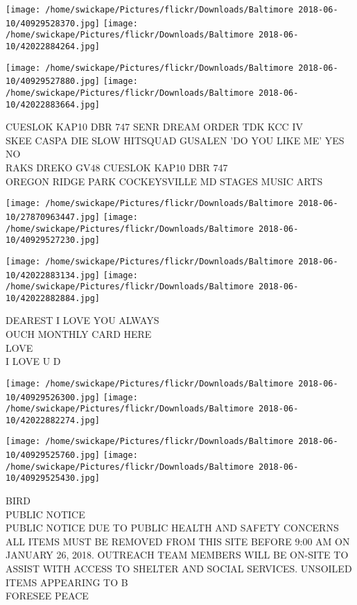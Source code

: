 \documentclass[10pt,letterpaper]{article}
\begin{document}
\texttt{[image: /home/swickape/Pictures/flickr/Downloads/Baltimore 2018-06-10/40929528370.jpg]}
\texttt{[image: /home/swickape/Pictures/flickr/Downloads/Baltimore 2018-06-10/42022884264.jpg]}

\texttt{[image: /home/swickape/Pictures/flickr/Downloads/Baltimore 2018-06-10/40929527880.jpg]}
\texttt{[image: /home/swickape/Pictures/flickr/Downloads/Baltimore 2018-06-10/42022883664.jpg]}

CUESLOK KAP10 DBR 747 SENR DREAM ORDER TDK KCC IV\\
SKEE CASPA DIE SLOW HITSQUAD GUSALEN 'DO YOU LIKE ME' YES NO\\
RAKS DREKO GV48 CUESLOK KAP10 DBR 747\\
OREGON RIDGE PARK COCKEYSVILLE MD STAGES MUSIC ARTS
\pagebreak

\texttt{[image: /home/swickape/Pictures/flickr/Downloads/Baltimore 2018-06-10/27870963447.jpg]}
\texttt{[image: /home/swickape/Pictures/flickr/Downloads/Baltimore 2018-06-10/40929527230.jpg]}

\texttt{[image: /home/swickape/Pictures/flickr/Downloads/Baltimore 2018-06-10/42022883134.jpg]}
\texttt{[image: /home/swickape/Pictures/flickr/Downloads/Baltimore 2018-06-10/42022882884.jpg]}

DEAREST I LOVE YOU ALWAYS\\
OUCH MONTHLY CARD HERE\\
LOVE\\
I LOVE U D
\pagebreak

\texttt{[image: /home/swickape/Pictures/flickr/Downloads/Baltimore 2018-06-10/40929526300.jpg]}
\texttt{[image: /home/swickape/Pictures/flickr/Downloads/Baltimore 2018-06-10/42022882274.jpg]}

\texttt{[image: /home/swickape/Pictures/flickr/Downloads/Baltimore 2018-06-10/40929525760.jpg]}
\texttt{[image: /home/swickape/Pictures/flickr/Downloads/Baltimore 2018-06-10/40929525430.jpg]}

BIRD\\
PUBLIC NOTICE\\
PUBLIC NOTICE DUE TO PUBLIC HEALTH AND SAFETY CONCERNS ALL ITEMS MUST BE REMOVED FROM THIS SITE BEFORE 9:00 AM ON JANUARY 26, 2018.  OUTREACH TEAM MEMBERS WILL BE ON{-}SITE TO ASSIST WITH ACCESS TO SHELTER AND SOCIAL SERVICES.  UNSOILED ITEMS APPEARING TO B\\
FORESEE PEACE
\pagebreak
\end{document}
